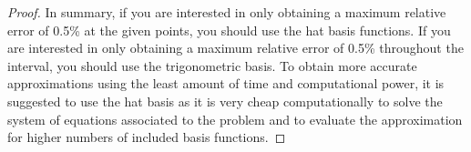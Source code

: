\begin{proof}
  In summary, if you are interested in only obtaining a maximum relative error of 0.5\%
  at the given points, you should use the hat basis functions. If you are interested in
  only obtaining a maximum relative error of 0.5\% throughout the interval, you should
  use the trigonometric basis. To obtain more accurate approximations using the least
  amount of time and computational power, it is suggested to use the
  hat basis as it is very cheap computationally to solve the system of equations
  associated to the problem and to evaluate the approximation for higher numbers
  of included basis functions.
\end{proof}